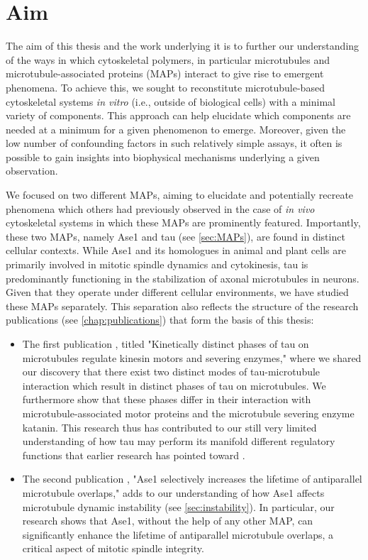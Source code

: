 \chapter{Aim}
The aim of this thesis and the work underlying it is to further our understanding of the ways in which cytoskeletal polymers, in particular microtubules and microtubule-associated proteins (MAPs) interact to give rise to emergent phenomena. To achieve this, we sought to reconstitute microtubule-based cytoskeletal systems \textit{in vitro} (i.e., outside of biological cells) with a minimal variety of components. This approach can help elucidate which components are needed at a minimum for a given phenomenon to emerge. Moreover, given the low number of confounding factors in such relatively simple assays, it often is possible to gain insights into biophysical mechanisms underlying a given observation. \par
We focused on two different MAPs, aiming to elucidate and potentially recreate phenomena which others had previously observed in the case of \textit{in vivo} cytoskeletal systems in which these MAPs are prominently featured. Importantly, these two MAPs, namely Ase1 and tau (see \autoref{sec:MAPs}), are found in distinct cellular contexts. While Ase1 and its homologues in animal and plant cells are primarily involved in mitotic spindle dynamics and cytokinesis, tau is predominantly functioning in the stabilization of axonal microtubules in neurons. Given that they operate under different cellular environments, we have studied these MAPs separately. This separation also reflects the structure of the research publications (see \autoref{chap:publications}) that form the basis of this thesis:
\begin{itemize}
    \item The first publication \parencite{Siahaan2019a}, titled "Kinetically distinct phases of tau on microtubules regulate kinesin motors and severing enzymes," where we shared our discovery that there exist two distinct modes of tau-microtubule interaction which result in distinct phases of tau on microtubules. We furthermore show that these phases differ in their interaction with microtubule-associated motor proteins and the microtubule severing enzyme katanin. This research thus has contributed to our still very limited understanding of how tau may perform its manifold different regulatory functions that earlier research has pointed toward \parencite{Morris2011b}.
    \item The second publication \parencite{Krattenmacher2024}, "Ase1 selectively increases the lifetime of antiparallel microtubule overlaps," adds to our understanding of how Ase1 affects microtubule dynamic instability (see \autoref{sec:instability}). In particular, our research shows that Ase1, without the help of any other MAP, can significantly enhance the lifetime of antiparallel microtubule overlaps, a critical aspect of mitotic spindle integrity.
\end{itemize}
